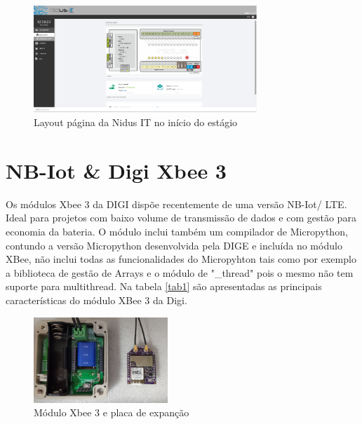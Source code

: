 \begin{figure}[ht]
  \centering
  \includegraphics[width=0.75\textwidth]{images/layoutPAginaInit.png}
  \caption{Layout página da Nidus IT no início do estágio}\label{fignidusPage}
\end{figure}


\section {NB-Iot \& Digi Xbee 3 }\label{nbiot}
\par
Os módulos Xbee 3 da DIGI dispõe recentemente de uma versão NB-Iot/ LTE. Ideal para projetos com baixo volume de transmissão de dados e com gestão para economia da bateria. O módulo inclui também um compilador de Micropython, contundo a versão Micropython desenvolvida pela DIGE e incluída no módulo XBee, não inclui todas as funcionalidades do Micropyhton tais como por exemplo a biblioteca de gestão de Arrays e o módulo de "\_thread" pois o mesmo não tem suporte para multithread.
Na tabela \ref{tab1} são apresentadas as principais características do módulo XBee 3 da Digi\cite{Digixbee}.

\begin{figure}[ht]
  \centering
  \includegraphics[width=0.45\textwidth]{images/xbee.jpg}
  \caption{Módulo Xbee 3 e placa de expanção}\label{figxbee}
\end{figure}

